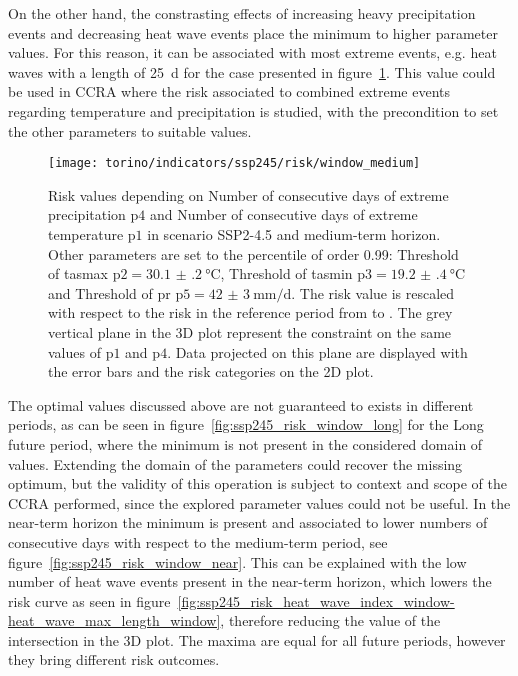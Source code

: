 On the other hand, the constrasting effects of increasing heavy precipitation events and decreasing heat wave events place the minimum to higher parameter values. For this reason, it can be associated with most extreme events, e.g. heat waves with a length of \qty{25}{\day} for the case presented in figure~\ref{fig:ssp245_risk_window_medium}.
This value could be used in \gls{CCRA} where the risk associated to combined extreme events regarding temperature and precipitation is studied, with the precondition to set the other parameters to suitable values.

\begin{figure}
  \centering
  \texttt{[image: torino/indicators/ssp245/risk/window\_medium]}
  \caption{Risk values depending on {Number of consecutive days of extreme precipitation} $\mathrm{p4}$ and {Number of consecutive days of extreme temperature} $\mathrm{p1}$ in scenario SSP2-4.5 and medium-term horizon. Other parameters are set to the percentile of order \num{0.99}: {Threshold of \gls{tasmax}} $\mathrm{p2} = \qty{30.1(2)}{\degreeCelsius}$, {Threshold of \gls{tasmin}} $\mathrm{p3} = \qty{19.2(4)}{\degreeCelsius}$ and {Threshold of \gls{pr}} $\mathrm{p5} = \qty{42(3)}{\milli\metre\per\day}$. The risk value is rescaled with respect to the risk in the reference period from  to . The grey vertical plane in the 3D plot represent the constraint on the same values of $\mathrm{p1}$ and $\mathrm{p4}$. Data projected on this plane are displayed with the error bars and the risk categories on the 2D plot.}
  \label{fig:ssp245_risk_window_medium}
\end{figure}

The optimal values discussed above are not guaranteed to exists in different periods, as can be seen in figure~\ref{fig:ssp245_risk_window_long} for the Long future period, where the minimum is not present in the considered domain of values. Extending the domain of the parameters could recover the missing optimum, but the validity of this operation is subject to context and scope of the \gls{CCRA} performed, since the explored parameter values could not be useful.
In the near-term horizon the minimum is present and associated to lower numbers of consecutive days with respect to the medium-term period, see figure~\ref{fig:ssp245_risk_window_near}. This can be explained with the low number of heat wave events present in the near-term horizon, which lowers the risk curve as seen in figure~\ref{fig:ssp245_risk_heat_wave_index_window-heat_wave_max_length_window}, therefore reducing the value of the intersection in the 3D plot.
The maxima are equal for all future periods, however they bring different risk outcomes.

